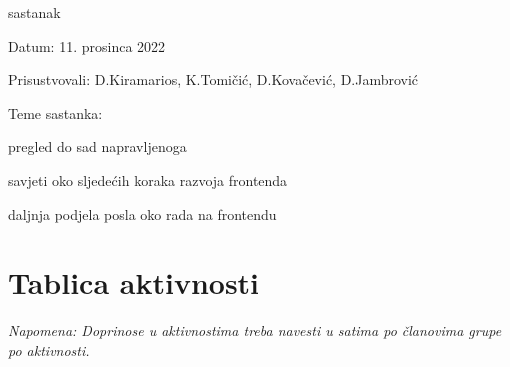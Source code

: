 \begin{packed_enum}
			\item  sastanak
			\item[] \begin{packed_item}
				\item Datum: 11. prosinca 2022
				\item Prisustvovali: D.Kiramarios, K.Tomičić, D.Kovačević, D.Jambrović
				\item Teme sastanka:
				\begin{packed_item}
					\item pregled do sad napravljenoga
					\item savjeti oko sljedećih koraka razvoja frontenda
					\item daljnja podjela posla oko rada na frontendu
				\end{packed_item}
			\end{packed_item}
			
		\end{packed_enum}
		
		\eject
		\section*{Tablica aktivnosti}
		
			
			 \textit{Napomena: Doprinose u aktivnostima treba navesti u satima po članovima grupe po aktivnosti.}


